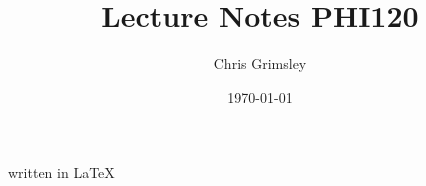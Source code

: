 \documentclass[11pt]{article}
\title{\textbf{Lecture Notes PHI120}}
\author{Chris Grimsley}
\date{\today}
\begin{document}
\maketitle
\begin{center}
\vspace{3in}
written in \LaTeX
\end{center}
\newpage






\end{document}
